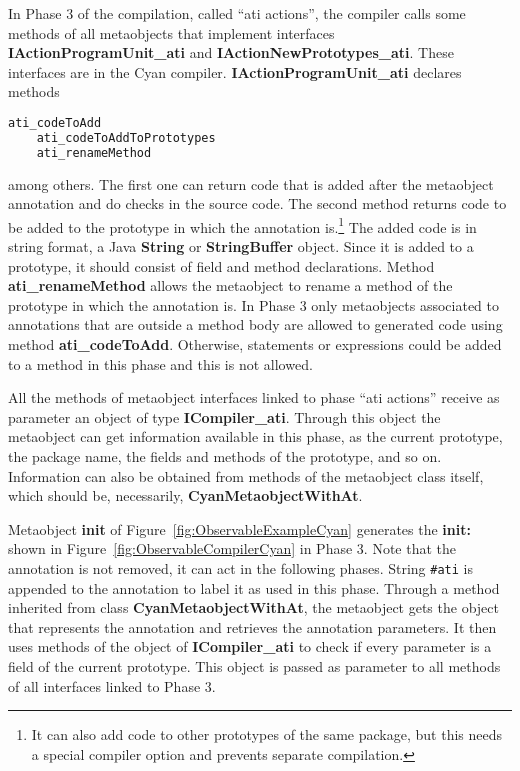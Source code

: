\documentclass[preprint,review]{elsarticle}
\newcommand{\srcstyle}[1]{\ttfamily\textbf{#1}\rmfamily}
\begin{document}
In Phase 3 of the compilation, called ``ati actions'', the compiler calls some methods of all metaobjects that implement interfaces \srcstyle{IActionProgramUnit\_ati} and
\srcstyle{IActionNewPrototypes\_ati}. These interfaces are in the Cyan compiler. \srcstyle{IActionProgramUnit\_ati} declares methods
\begin{lstlisting}[language=Java]
    ati_codeToAdd
    ati_codeToAddToPrototypes
    ati_renameMethod
\end{lstlisting}
among others. The first one can return code that is added after the metaobject annotation and do checks in the source code. The second method returns code to be added to the prototype in which the annotation is.\footnote{It can also add code to other prototypes of the same package, but this needs a special compiler option and prevents separate compilation.}
The added code is in string format, a Java \srcstyle{String} or \srcstyle{StringBuffer} object. Since it is added to a prototype, it should consist of field and method declarations.
Method \srcstyle{ati\_renameMethod} allows the  metaobject to rename a
method of the prototype in which the annotation is.
In Phase 3 only metaobjects associated to annotations that are outside
a   method  body   are  allowed   to  generated   code  using   method
\srcstyle{ati\_codeToAdd}. Otherwise, statements  or expressions could
be added to a method in this phase and this  is not allowed.

All  the  methods  of  metaobject interfaces  linked  to  phase  ``ati
actions''    receive    as    parameter     an    object    of    type
\srcstyle{ICompiler\_ati}. Through this object  the metaobject can get
information available  in this  phase, as  the current  prototype, the
package  name,  the  fields  and  methods of  the  prototype,  and  so
on. Information  can also be  obtained from methods of  the metaobject
class itself, which should be, necessarily, \srcstyle{CyanMetaobjectWithAt}.

Metaobject \srcstyle{init} of Figure~\ref{fig:ObservableExampleCyan} generates the \srcstyle{init:} shown in Figure~\ref{fig:ObservableCompilerCyan} in Phase 3. Note that the annotation is not removed, it can act in the following phases. String \verb|#ati| is appended to the annotation to label it as used in this phase. Through a method inherited from class \srcstyle{CyanMetaobjectWithAt}, the metaobject gets the object that represents the annotation and retrieves the annotation parameters. It then uses methods of the object of \srcstyle{ICompiler\_ati} to check if every parameter is a field of the current prototype. This object is passed as parameter to all methods of all interfaces linked to Phase 3.
\end{document}
